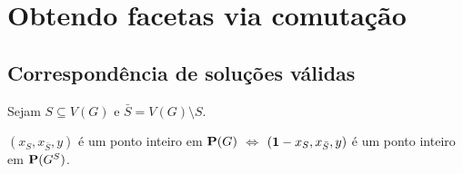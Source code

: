\documentclass[
12pt,notheorems,hyperref={pdfauthor=whatever}
]{beamer}
\begin{document}

\section{Obtendo facetas via comutação}
\subsection{Correspondência de soluções válidas}
\begin{frame}
    
    Sejam $S \subseteq V(G)$ e $\bar S=V(G)\setminus S$.
    \pause

    \begin{lemma} \label{lem:points}
        $(x_S,x_{\bar S},y)$ é um ponto inteiro em $\mathbf{P}(G)$ $\iff$ $(\mathbf{1}-x_S,x_{\bar S},y)$ é um ponto inteiro em $\mathbf{P}(G^S)$.
    \end{lemma}

    \begin{figure}[h]
        \centering
        
        {}
    \end{figure}
    
    \vspace{-0.8em}
\end{frame}
\end{document}
